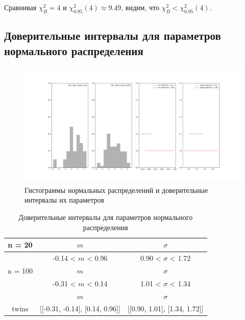 \noindent Сравнивая $\chi^{2}_{B} = 4$ и $\chi^{2}_{0.95}(4) \approx 9.49$, видим, что $\chi^{2}_{B} < \chi^{2}_{0.95}(4)$.

\subsection{Доверительные интервалы для параметров нормального распределения}
\begin{figure}[H]
	\centering
	\includegraphics[width = 18cm, height = 6cm]{resources/8_1.png}
	\caption{Гистограммы нормальных распределений и доверительные интервалы их параметров}
	\label{w_pert}
\end{figure}

\begin{table}[H]
	\centering
	\begin{tabular}{| c | c | c |}
		\hline
		n = 20   &  $m$  & $\sigma$\\ \hline
		&  -0.14 < $m$ < 0.96 & 0.90 < $\sigma$ < 1.72 \\ \hline
		n = 100   &  $m$  & $\sigma$\\ \hline
		& -0.31 < $m$ < 0.14 & 1.01 < $\sigma$ < 1.34 \\ \hline
		& $m$ & $\sigma$\\ \hline
		twins & [[-0.31, -0.14], [0.14, 0.96]] & [[0.90, 1.01], [1.34, 1.72]] \\
		\hline
	\end{tabular}
	\caption{Доверительные интервалы для параметров нормального распределения}
	\label{tab:interv_simple}
\end{table}

